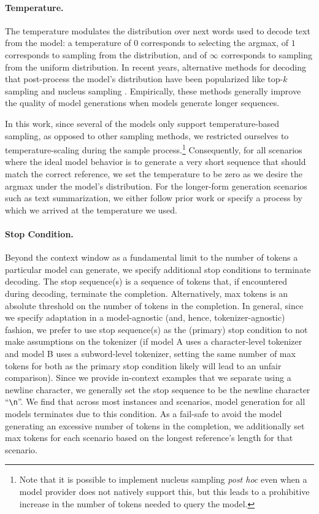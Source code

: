 \paragraph{Temperature.}
The temperature modulates the distribution over next words used to decode text from the model: a temperature of $0$ corresponds to selecting the argmax, of $1$ corresponds to sampling from the distribution, and of $\infty$ corresponds to sampling from the uniform distribution.
In recent years, alternative methods for decoding that post-process the model's distribution have been popularized like top-$k$ sampling and nucleus sampling \citep{holtzman2020curious}.
Empirically, these methods generally improve the quality of model generations when models generate longer sequences.

In this work, since several of the models only support temperature-based sampling, as opposed to other sampling methods, we restricted ourselves to temperature-scaling during the sample process.\footnote{Note that it is possible to implement nucleus sampling \textit{post hoc} even when a model provider does not natively support this, but this leads to a prohibitive increase in the number of tokens needed to query the model.}
Consequently, for all scenarios where the ideal model behavior is to generate a very short sequence that should match the correct reference, we set the temperature to be zero as we desire the argmax under the model's distribution.
For the longer-form generation scenarios such as text summarization, we either follow prior work or specify a process by which we arrived at the temperature we used.


\paragraph{Stop Condition.}
Beyond the context window as a fundamental limit to the number of tokens a particular model can generate, we specify additional stop conditions to terminate decoding. 
The stop sequence(s) is a sequence of tokens that, if encountered during decoding, terminate the completion.
Alternatively, max tokens is an absolute threshold on the number of tokens in the completion.
In general, since we specify adaptation in a model-agnostic (and, hence, tokenizer-agnostic) fashion, we prefer to use stop sequence(s) as the (primary) stop condition to not make assumptions on the tokenizer (\eg if model A uses a character-level tokenizer and model B uses a subword-level tokenizer, setting the same number of max tokens for both as the primary stop condition likely will lead to an unfair comparison). 
Since we provide in-context examples that we separate using a newline character, we generally set the stop sequence to be the newline character ``\texttt{\textbackslash n}''.
We find that across most instances and scenarios, model generation for all models terminates due to this condition.
As a fail-safe to avoid the model generating an excessive number of tokens in the completion, we additionally set max tokens for each scenario based on the longest reference's length for that scenario.

